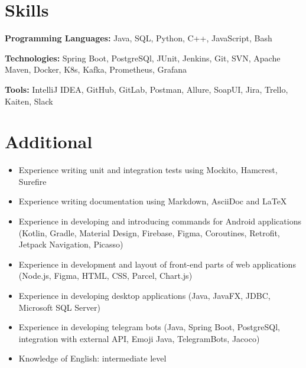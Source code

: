 \documentclass[a4paper,9pt]{report}
\newcommand{\bulletItem}[1]{\item[$\bullet$] #1}
\begin{document}
\section{Skills}
\begin{itemize}[leftmargin=0.15in, label={}]
\small{\item{

\textbf{Programming Languages:}{ Java, SQL, Python, C++, JavaScript, Bash} \ \vspace{3pt}

\textbf{Technologies:}{ Spring Boot, PostgreSQl, JUnit, Jenkins, Git, SVN, Apache Maven, Docker, K8s, Kafka, Prometheus, Grafana} \ \vspace{3pt}

\textbf{Tools:}{ IntelliJ IDEA, GitHub, GitLab, Postman, Allure, SoapUI, Jira, Trello, Kaiten, Slack} \ \vspace{3pt}

}}
\end{itemize}
\vspace{-10pt}

\section{Additional}
\begin{itemize}
\bulletItem{Experience writing unit and integration tests using Mockito, Hamcrest, Surefire}
\bulletItem{Experience writing documentation using Markdown, AsciiDoc and LaTeX}
\bulletItem{Experience in developing and introducing commands for Android applications (Kotlin, Gradle, Material Design, Firebase, Figma, Coroutines, Retrofit, Jetpack Navigation, Picasso)}
\bulletItem{Experience in development and layout of front-end parts of web applications (Node.js, Figma, HTML, CSS, Parcel, Chart.js)}
\bulletItem{Experience in developing desktop applications (Java, JavaFX, JDBC, Microsoft SQL Server)}
\bulletItem{Experience in developing telegram bots (Java, Spring Boot, PostgreSQl, integration with external API, Emoji Java, TelegramBots, Jacoco)}
\bulletItem{Knowledge of English: intermediate level}
\end{itemize}
\end{document}
